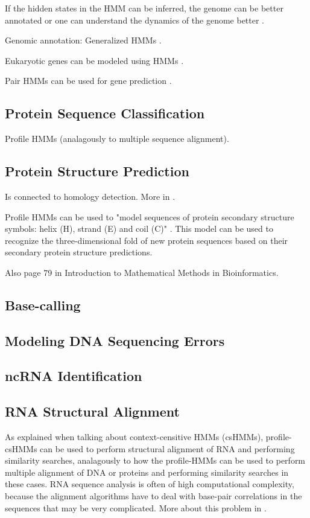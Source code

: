 \documentclass{article}
\begin{document}
If the hidden states in the HMM can be inferred, the genome can be better annotated or one can understand the dynamics of the genome better \cite{Christianini2006}.

Genomic annotation: Generalized HMMs \cite{Choo2004}.

Eukaryotic genes can be modeled using HMMs \cite{Yoon2009}. 

Pair HMMs can be used for gene prediction \cite{Yoon2009}.


\subsection{Protein Sequence Classification}

Profile HMMs (analagously to multiple sequence alignment). 


\subsection{Protein Structure Prediction}
Is connected to homology detection. More in \cite{Choo2004}.

Profile HMMs can be used to "model sequences of protein secondary structure symbols: helix (H), strand (E) and coil (C)" \cite{Yoon2009}. This model can be used to recognize the three-dimensional fold of new protein sequences based on their secondary protein structure predictions. 

Also page 79 in Introduction to Mathematical Methods in Bioinformatics. 


\subsection{Base-calling}
\cite{Yoon2009}
\subsection{Modeling DNA Sequencing Errors}
\cite{Yoon2009}
\subsection{ncRNA Identification}
\cite{Yoon2009}
\subsection{RNA Structural Alignment}
As explained when talking about context-censitive HMMs (csHMMs), profile-csHMMs can be used to perform structural alignment of RNA and performing similarity searches, analagously to how the profile-HMMs can be used to perform multiple alignment of DNA or proteins and performing similarity searches in these cases. RNA sequence analysis is often of high computational complexity, because the alignment algorithms have to deal with base-pair correlations in the sequences that may be very complicated. More about this problem in \cite{Yoon2009}.
\end{document}
